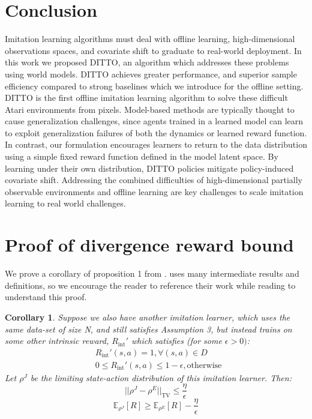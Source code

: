 \documentclass[10pt]{article} %
\theoremstyle{plain}
\newtheorem{corollary}[theorem]{Corollary}
\theoremstyle{definition}
\theoremstyle{remark}
\begin{document}
\section{Conclusion}
Imitation learning algorithms must deal with offline learning, high-dimensional observations spaces, and covariate shift to graduate to real-world deployment. In this work we proposed DITTO, an algorithm which addresses these problems using world models. DITTO achieves greater performance, and superior sample efficiency compared to strong baselines which we introduce for the offline setting. DITTO is the first offline imitation learning algorithm to solve these difficult Atari environments from pixels. Model-based methods are typically thought to cause generalization challenges, since agents trained in a learned model can learn to exploit generalization failures of both the dynamics or learned reward function. In contrast, our formulation encourages learners to return to the data distribution using a simple fixed reward function defined in the model latent space. By learning under their own distribution, DITTO policies mitigate policy-induced covariate shift. Addressing the combined difficulties of high-dimensional partially observable environments and offline learning are key challenges to scale imitation learning to real world challenges.




\appendix
\section{Proof of divergence reward bound}\label{appendixproof}
We prove a corollary of proposition 1 from \citet{ILbyRL}. \citet{ILbyRL} uses many intermediate results and definitions, so we encourage the reader to reference their work while reading to understand this proof.
\begin{corollary}
Suppose we also have another imitation learner, which uses the same data-set of size N, and still satisfies Assumption 3, but instead trains on some other intrinsic reward, $R_{\text{int}}'$ which satisfies (for some $\epsilon > 0)$:
\begin{align*}
    &R_{\text{int}}'(s,a) = 1 , \forall (s,a)\in D\\
    & 0 \leq R_{\text{int}}'(s,a) \leq 1 - \epsilon, \text{otherwise} \
\end{align*}
Let $\rho^J$ be the limiting state-action distribution of this imitation learner. Then:
\begin{equation*}
    ||\rho^J - \rho^E||_{\text{TV}} \leq \frac{\eta}{\epsilon}
\end{equation*}
\begin{equation*}
    \mathbb{E}_{\rho^J}[R] \geq  \mathbb{E}_{\rho^E}[R] -  \frac{\eta}{\epsilon}
\end{equation*}

\end{corollary}
\end{document}
